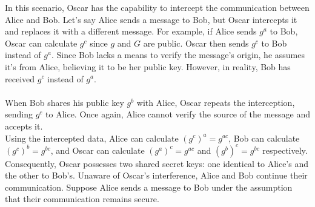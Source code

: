 \documentclass[11pt]{article}
\begin{document}
\begin{center}
\end{center} 
In this scenario, Oscar has the capability to intercept the communication between Alice and Bob. Let's say Alice sends a message to Bob, but Oscar intercepts it and replaces it with a different message. For example, if Alice sends \( g^a \) to Bob, Oscar can calculate \( g^c \) since \( g \) and \( G \) are public. Oscar then sends \( g^c \) to Bob instead of \( g^a \). Since Bob lacks a means to verify the message's origin, he assumes it's from Alice, believing it to be her public key. However, in reality, Bob has received \( g^c \) instead of \( g^a \).\\
\\
When Bob shares his public key \( g^b \) with Alice, Oscar repeats the interception, sending \( g^c \) to Alice. Once again, Alice cannot verify the source of the message and accepts it.\\

\newline
Using the intercepted data, Alice can calculate \( (g^c)^a = g^{ac} \), Bob can calculate \( (g^c)^b = g^{bc} \), and Oscar can calculate \( (g^a)^c = g^{ac} \) and \( (g^b)^c = g^{bc} \) respectively. Consequently, Oscar possesses two shared secret keys: one identical to Alice's and the other to Bob's.
Unaware of Oscar's interference, Alice and Bob continue their communication. Suppose Alice sends a message to Bob under the assumption that their communication remains secure.
\end{document}

